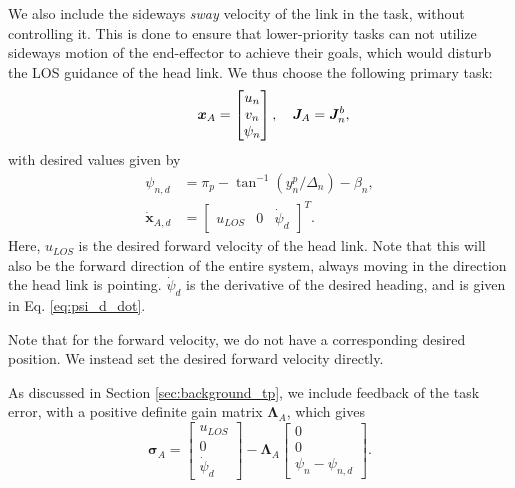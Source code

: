 \documentclass[../main.tex]{subfiles}
\begin{document}
We also include the sideways \emph{sway} velocity of the link in the task, without controlling it. This is done to ensure that lower-priority tasks can not utilize sideways motion of the end-effector to achieve their goals, which would disturb the LOS guidance of the head link. We thus choose the following primary task:
\begin{equation}
    \label{eq:task_a}
    \qquad \bm{x}_A = \begin{bmatrix}
        u_n \\ v_n \\ \psi_n
    \end{bmatrix}, \quad
    \bm{J}_A = \bm{J}_n^b,
    \setlength\abovedisplayskip{-5pt}
\end{equation}
with desired values given by
\begin{subequations}
\begin{align}
    \label{eq:desired_xa}
    \psi_{n, d} &=
        \pi_p - \tan^{-1}(y_n^p / \Delta_n) - \beta_{n},
    \\
    \dot{\bm{x}}_{A, d} &= \begin{bmatrix}
        u_{LOS} & 0 & \dot{\psi}_d
    \end{bmatrix}^T.
\end{align}
\end{subequations}
Here, $u_{LOS}$ is the desired forward velocity of the head link. Note that this will also be the forward direction of the entire system, always moving in the direction the head link is pointing. $\dot{\psi}_d$ is the derivative of the desired heading, and is given in Eq. \eqref{eq:psi_d_dot}.
\begin{remark}
    Note that for the forward velocity, we do not have a corresponding desired position. We instead set the desired forward velocity directly.
\end{remark}
As discussed in Section \ref{sec:background_tp}, we include feedback of the task error, with a positive definite gain matrix $\bm{\Lambda}_A$, which gives
\begin{equation}
    \bm{\sigma}_A = \begin{bmatrix} u_{LOS} \\ 0 \\ \dot{\psi}_d \end{bmatrix} - \bm{\Lambda}_A \begin{bmatrix}
        0 \\ 0 \\ \psi_n - \psi_{n,d}
    \end{bmatrix}.
\end{equation}
\end{document}
